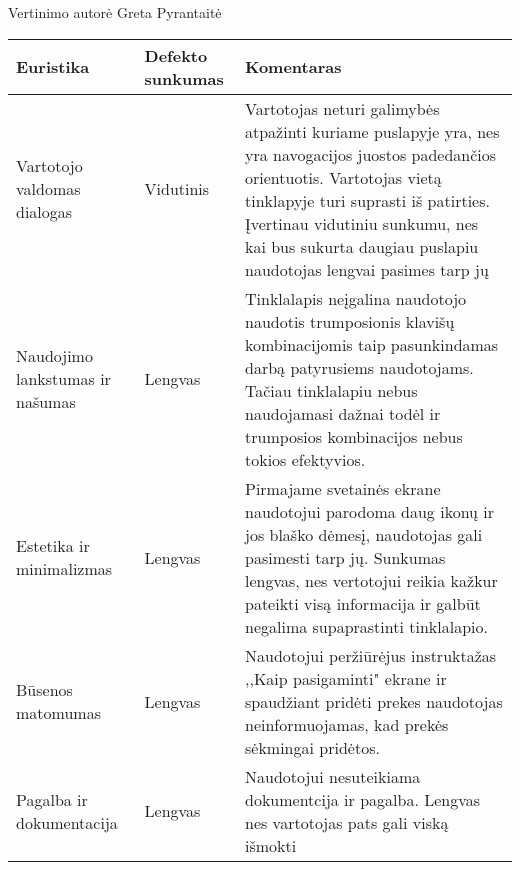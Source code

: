 \documentclass[oneside]{VUMIFPSkursinis}
\begin{document}
Vertinimo autorė Greta Pyrantaitė
\begin{center}
    \begin{tabular}{ |p{3cm}| p{3cm} | p{11cm} | }
    \hline
	Euristika &Defekto sunkumas & Komentaras \\ \hline
	Vartotojo valdomas dialogas & Vidutinis & Vartotojas neturi galimybės atpažinti kuriame puslapyje yra, nes yra navogacijos juostos padedančios orientuotis. Vartotojas vietą tinklapyje turi suprasti iš patirties. Įvertinau vidutiniu sunkumu, nes kai bus sukurta daugiau puslapiu naudotojas lengvai pasimes tarp jų \\ \hline
	Naudojimo lankstumas ir našumas & Lengvas & Tinklalapis neįgalina naudotojo naudotis trumposionis klavišų kombinacijomis taip pasunkindamas darbą patyrusiems naudotojams. Tačiau tinklalapiu nebus naudojamasi dažnai todėl ir trumposios kombinacijos nebus tokios efektyvios. \\ \hline
	Estetika ir minimalizmas & Lengvas & Pirmajame svetainės ekrane naudotojui parodoma daug ikonų ir jos blaško dėmesį, naudotojas gali pasimesti tarp jų. Sunkumas lengvas, nes vertotojui reikia kažkur pateikti visą informacija ir galbūt negalima supaprastinti tinklalapio. \\ \hline
	Būsenos matomumas & Lengvas & Naudotojui peržiūrėjus instruktažas ,,Kaip pasigaminti" ekrane ir spaudžiant pridėti prekes naudotojas neinformuojamas, kad prekės sėkmingai pridėtos. \\ \hline
	Pagalba ir dokumentacija & Lengvas & Naudotojui nesuteikiama dokumentcija ir pagalba. Lengvas nes vartotojas pats gali viską išmokti \\ \hline	 
   \hline
    \end{tabular}
\end{center}
\end{document}

